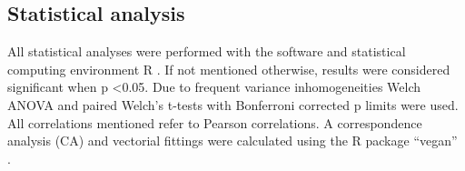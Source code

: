 

\subsection*{Statistical analysis}
All statistical analyses were performed with the software and statistical computing environment R \cite{R}. If not mentioned otherwise, results were considered significant when p \textless 0.05. Due to frequent variance inhomogeneities Welch ANOVA and paired Welch's t-tests with Bonferroni corrected p limits were used. All correlations mentioned refer to Pearson correlations. A correspondence analysis (CA) and vectorial fittings were calculated using the R package ``vegan'' \cite{vegan}.
